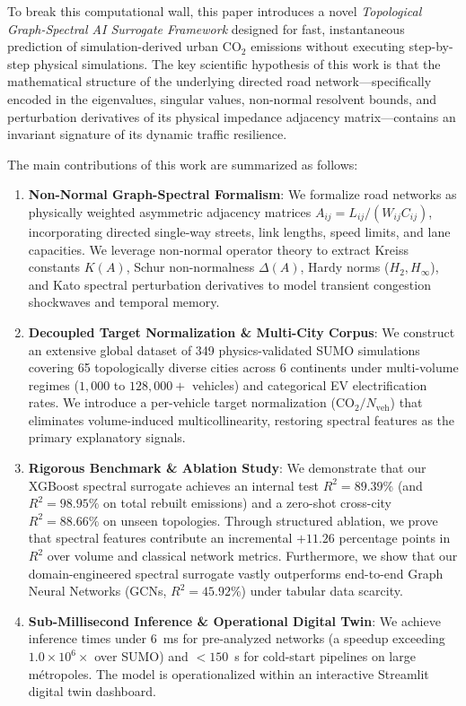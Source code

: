 \documentclass[lettersize,journal]{IEEEtran}
\begin{document}
To break this computational wall, this paper introduces a novel \emph{Topological Graph-Spectral AI Surrogate Framework} designed for fast, instantaneous prediction of simulation-derived urban $\text{CO}_2$ emissions without executing step-by-step physical simulations. The key scientific hypothesis of this work is that the mathematical structure of the underlying directed road network—specifically encoded in the eigenvalues, singular values, non-normal resolvent bounds, and perturbation derivatives of its physical impedance adjacency matrix—contains an invariant signature of its dynamic traffic resilience.

The main contributions of this work are summarized as follows:
\begin{enumerate}
    \item \textbf{Non-Normal Graph-Spectral Formalism}: We formalize road networks as physically weighted asymmetric adjacency matrices $A_{ij} = L_{ij}/(W_{ij} C_{ij})$, incorporating directed single-way streets, link lengths, speed limits, and lane capacities. We leverage non-normal operator theory to extract Kreiss constants $K(A)$, Schur non-normalness $\Delta(A)$, Hardy norms ($H_2, H_\infty$), and Kato spectral perturbation derivatives to model transient congestion shockwaves and temporal memory.
    \item \textbf{Decoupled Target Normalization \& Multi-City Corpus}: We construct an extensive global dataset of 349 physics-validated SUMO simulations covering 65 topologically diverse cities across 6 continents under multi-volume regimes ($1,000$ to $128,000+$ vehicles) and categorical EV electrification rates. We introduce a per-vehicle target normalization ($\text{CO}_2 / N_{\text{veh}}$) that eliminates volume-induced multicollinearity, restoring spectral features as the primary explanatory signals.
    \item \textbf{Rigorous Benchmark \& Ablation Study}: We demonstrate that our XGBoost spectral surrogate achieves an internal test $R^2 = 89.39\%$ (and $R^2 = 98.95\%$ on total rebuilt emissions) and a zero-shot cross-city $R^2 = 88.66\%$ on unseen topologies. Through structured ablation, we prove that spectral features contribute an incremental $+11.26$ percentage points in $R^2$ over volume and classical network metrics. Furthermore, we show that our domain-engineered spectral surrogate vastly outperforms end-to-end Graph Neural Networks (GCNs, $R^2 = 45.92\%$) under tabular data scarcity.
    \item \textbf{Sub-Millisecond Inference \& Operational Digital Twin}: We achieve inference times under $6$~ms for pre-analyzed networks (a speedup exceeding $1.0 \times 10^6 \times$ over SUMO) and $<150$~s for cold-start pipelines on large métropoles. The model is operationalized within an interactive Streamlit digital twin dashboard.
\end{enumerate}
\end{document}
